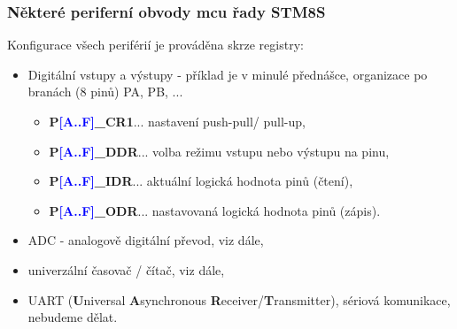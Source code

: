 	\begin{frame}
    \frametitle{Některé periferní obvody mcu řady STM8S}

		Konfigurace všech periférií je prováděna skrze registry:
		\vspace{3mm}
		
		\begin{itemize}
			\item Digitální vstupy a výstupy - příklad je v minulé přednášce, organizace po branách (8 pinů) PA, PB, ...
			
			\begin{itemize}
				\item \textbf{P\textcolor{blue}{[A..F]}\_CR1}... nastavení push-pull/ pull-up,
				\item \textbf{P\textcolor{blue}{[A..F]}\_DDR}... volba režimu vstupu nebo výstupu na pinu,
				\item \textbf{P\textcolor{blue}{[A..F]}\_IDR}... aktuální logická hodnota pinů (čtení),
				\item \textbf{P\textcolor{blue}{[A..F]}\_ODR}... nastavovaná logická hodnota pinů (zápis).
			\end{itemize}
			
			\vspace{3mm}
			\item ADC - analogově digitální převod, viz dále,
			\item univerzální časovač / čítač, viz dále,
			\item UART (\textbf{U}niversal \textbf{A}synchronous \textbf{R}eceiver/\textbf{T}ransmitter), sériová komunikace, nebudeme dělat.
		\end{itemize}
		
	\end{frame}